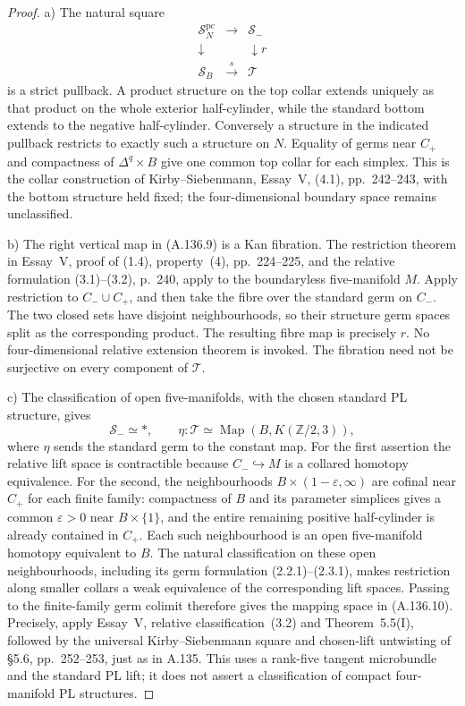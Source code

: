 \begin{proof}
a) The natural square
\[
\begin{array}{ccc}
\mathcal S_N^{\mathrm{pc}}&\longrightarrow&\mathcal S_-\\
\downarrow&&\downarrow r\\
\mathcal S_B&\xrightarrow{\ s\ }&\mathcal T
\end{array}                                             \tag{A.136.9}
\]
is a strict pullback. A product structure on the top collar extends
uniquely as that product on the whole exterior half-cylinder, while
the standard bottom extends to the negative half-cylinder. Conversely
a structure in the indicated pullback restricts to exactly such a
structure on $N$. Equality of germs near $C_+$ and compactness of
$\Delta^q\times B$ give one common top collar for each simplex.
This is the collar construction of Kirby--Siebenmann, Essay~V,
(4.1), pp.~242--243, with the bottom structure held fixed; the
four-dimensional boundary space remains unclassified.

b) The right vertical map in (A.136.9) is a Kan fibration.
The restriction theorem in Essay~V, proof of (1.4), property~(4),
pp.~224--225, and the relative formulation (3.1)--(3.2), p.~240,
apply to the boundaryless five-manifold $M$. Apply restriction to
$C_-\cup C_+$, and then take the fibre over the standard germ on
$C_-$. The two closed sets have disjoint neighbourhoods, so their
structure germ spaces split as the corresponding product. The
resulting fibre map is precisely $r$. No four-dimensional relative
extension theorem is invoked. The fibration need not be surjective
on every component of $\mathcal T$.

c) The classification of open five-manifolds, with the chosen
standard PL structure, gives
\[
 \mathcal S_-\simeq *,\qquad
 \eta:\mathcal T\simeq
 \operatorname{Map}(B,K(\mathbb Z/2,3)),                 \tag{A.136.10}
\]
where $\eta$ sends the standard germ to the constant map.
For the first assertion the relative lift space is contractible
because $C_-\hookrightarrow M$ is a collared homotopy equivalence.
For the second, the neighbourhoods $B\times(1-\varepsilon,\infty)$
are cofinal near $C_+$ for each finite family: compactness of $B$
and its parameter simplices gives a common $\varepsilon>0$ near
$B\times\{1\}$, and the entire remaining positive half-cylinder
is already contained in $C_+$. Each such neighbourhood is an open
five-manifold homotopy equivalent to $B$. The natural classification
on these open neighbourhoods, including its germ formulation
(2.2.1)--(2.3.1), makes restriction along smaller collars a weak
equivalence of the corresponding lift spaces. Passing to the
finite-family germ colimit therefore gives the mapping space in
(A.136.10).
Precisely, apply Essay~V, relative classification~(3.2) and
Theorem~5.5(I), followed by the universal Kirby--Siebenmann square
and chosen-lift untwisting of \S5.6, pp.~252--253, just as in A.135.
This uses a rank-five tangent microbundle and the standard PL lift;
it does not assert a classification of compact four-manifold PL
structures.


\end{proof}
